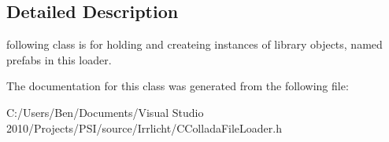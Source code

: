 \subsection{Detailed Description}
following class is for holding and createing instances of library objects, named prefabs in this loader. 

The documentation for this class was generated from the following file\-:\begin{DoxyCompactItemize}
\item 
C\-:/\-Users/\-Ben/\-Documents/\-Visual Studio 2010/\-Projects/\-P\-S\-I/source/\-Irrlicht/C\-Collada\-File\-Loader.\-h\end{DoxyCompactItemize}
